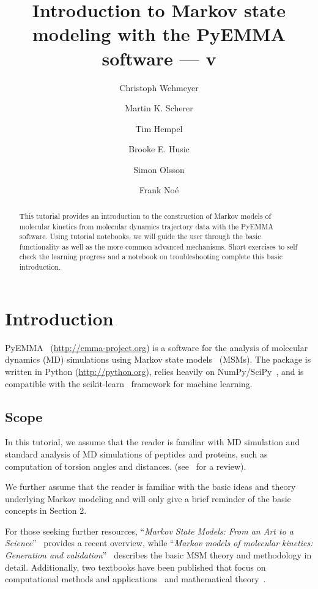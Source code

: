 \documentclass[9pt,tutorial]{livecoms}
\title{Introduction to Markov state modeling with the PyEMMA software --- v\versionnumber}
\author[1\authfn{1}*]{Christoph Wehmeyer}
\author[1\authfn{1}]{Martin K. Scherer}
\author[1\authfn{1}]{Tim Hempel}
\author[2]{Brooke E. Husic}
\author[1]{Simon Olsson}
\author[1*]{Frank Noé}
\affil[1]{Department of Mathematics and Computer Science, Freie Universität Berlin, Arnimallee 6, 14195 Berlin, Germany}
\affil[2]{Department of Chemistry, Stanford University, 333 Campus Drive, Stanford, California 94305, USA}
\begin{document}
\begin{frontmatter}
\maketitle

\begin{abstract}
This tutorial provides an introduction to the construction of Markov models of molecular kinetics from molecular dynamics trajectory data with the PyEMMA software.
Using tutorial notebooks, we will guide the user through the basic functionality as well as the more common advanced mechanisms.
Short exercises to self check the learning progress and a notebook on troubleshooting complete this basic introduction.
\end{abstract}

\end{frontmatter}

\section{Introduction}

PyEMMA~\cite{pyemma} (\url{http://emma-project.org}) is a software for the analysis of molecular dynamics (MD) simulations using Markov state models~\cite{schuette-msm,singhal-msm-naming,noe2007jcp,chodera2007jcp,buchete-msm-2008} (MSMs).
The package is written in Python (\url{http://python.org}), relies heavily on NumPy/SciPy~\cite{numpy,scipy}, and is compatible with the scikit-learn~\cite{sklearn} framework for machine learning.

\subsection{Scope}

In this tutorial, we assume that the reader is familiar with MD simulation and standard analysis of MD simulations of peptides and proteins, such as computation of torsion angles and distances. (see~\cite{dror2012biomolecular} for a review).

We further assume that the reader is familiar with the basic ideas and theory underlying Markov modeling and will only give a brief reminder of the basic concepts in Section 2.

For those seeking further resources, ``\emph{Markov State Models: From an Art to a Science}''~\cite{msm-brooke} provides a recent overview,
while ``\emph{Markov models of molecular kinetics: Generation and validation}''~\cite{msm-jhp} describes the basic MSM theory and methodology in detail.
Additionally, two textbooks have been published that focus on computational methods and applications~\cite{msm-book} and mathematical theory~\cite{schuette-sarich-book}.
\end{document}
